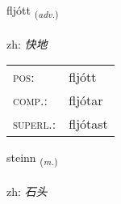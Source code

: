 \documentclass[frontgrid, backgrid]{flacards}\usepackage[]{graphicx}\usepackage[]{color}
\begin{document}
\renewcommand{\flhead}{\vskip5pt \fboxsep=0pt {\small\bfseries\footnotesize Atviksorð | 副词}}
\renewcommand{\fcfoot}{\vskip5pt \fboxsep=0pt \hspace{2pt}{\small\bfseries\footnotesize 2K}}

\renewcommand{\blhead}{\vskip5pt {\small\bfseries\footnotesize Atviksorð | 副词 }}
\renewcommand{\bcfoot}{\vskip5pt \hspace{2pt}{\small\bfseries\footnotesize 2K}}


{fljótt \small{\textsubscript{(\textit{adv.})}} \\[1ex] %
\textphonetic{[fljouht]} \\
zh: \emph{快地} \\  [2ex]
\renewcommand*{\arraystretch}{0.8}
\begin{tabular}{ll}
\textsc{pos}: & fljótt \\ 
\textsc{comp.}: & fljótar \\ 
\textsc{superl.}: & fljótast \\
\end{tabular}
}

\renewcommand{\flhead}{\vskip5pt \fboxsep=0pt {\small\bfseries\footnotesize Nafnorð | 名词}}
\renewcommand{\fcfoot}{\vskip5pt \fboxsep=0pt \hspace{2pt}{\small\bfseries\footnotesize 2K}}

\renewcommand{\blhead}{\vskip5pt {\small\bfseries\footnotesize Nafnorð | 名词 }}
\renewcommand{\bcfoot}{\vskip5pt \hspace{2pt}{\small\bfseries\footnotesize 2K}}


{steinn \small{\textsubscript{(\textit{m.})}} \\[1ex] %
\textphonetic{[steitn̥]} \\
zh: \emph{石头} \\  [2ex]
\renewcommand*{\arraystretch}{0.8}
}
\end{document}
